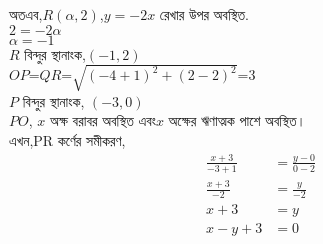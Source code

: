 \documentclass{article}
\begin{document}
অতএব,$R(\alpha,2)$,$y=-2x$ রেখার উপর অবস্থিত.\\
$2=-2\alpha$\\
 $\alpha=-1$\\
$R$ বিন্দুর স্থানাংক,$(-1,2)$\\
$OP$=$QR$=$\sqrt{(-4+1)^2+(2-2)^2}$=$3$\\
$P$ বিন্দুর স্থানাংক, $(-3,0)$\\
$PO$, $x$ অক্ষ বরাবর অবস্থিত এবং$x$ অক্ষের ঋণাত্মক পাশে অবস্থিত।\\
এখন,PR কর্ণের সমীকরণ,\\
\begin{align*}
	\frac{x+3}{-3+1}&=\frac{y-0}{0-2}\\
	\frac{x+3}{-2}&=\frac{y}{-2}\\
	x+3&=y\\
	x-y+3&=0\\
\end{align*}
\end{document}
